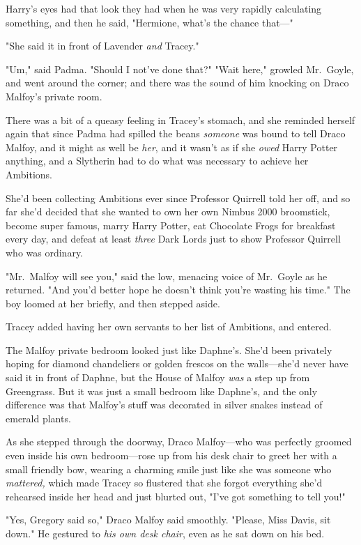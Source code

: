 Harry's eyes had that look they had when he was very rapidly calculating
something, and then he said, "Hermione, what's the chance that—"

"She said it in front of Lavender \emph{and} Tracey."

"Um," said Padma. "Should I not've done that?"
\sbreak
"Wait here," growled Mr.~Goyle, and went around the corner; and there was the
sound of him knocking on Draco Malfoy's private room.

There was a bit of a queasy feeling in Tracey's stomach, and she reminded
herself again that since Padma had spilled the beans \emph{someone} was bound
to tell Draco Malfoy, and it might as well be \emph{her}, and it wasn't as if
she \emph{owed} Harry Potter anything, and a Slytherin had to do what was
necessary to achieve her Ambitions.

She'd been collecting Ambitions ever since Professor Quirrell told her off, and
so far she'd decided that she wanted to own her own Nimbus 2000 broomstick,
become super famous, marry Harry Potter, eat Chocolate Frogs for breakfast
every day, and defeat at least \emph{three} Dark Lords just to show Professor
Quirrell who was ordinary.

"Mr.~Malfoy will see you," said the low, menacing voice of Mr.~Goyle as he
returned. "And you'd better hope he doesn't think you're wasting his time." The
boy loomed at her briefly, and then stepped aside.

Tracey added having her own servants to her list of Ambitions, and entered.

The Malfoy private bedroom looked just like Daphne's. She'd been privately
hoping for diamond chandeliers or golden frescos on the walls—she'd never
have said it in front of Daphne, but the House of Malfoy \emph{was} a step up
from Greengrass. But it was just a small bedroom like Daphne's, and the only
difference was that Malfoy's stuff was decorated in silver snakes instead of
emerald plants.

As she stepped through the doorway, Draco Malfoy—who was perfectly groomed
even inside his own bedroom—rose up from his desk chair to greet her with a
small friendly bow, wearing a charming smile just like she was someone who
\emph{mattered,} which made Tracey so flustered that she forgot everything
she'd rehearsed inside her head and just blurted out, "I've got something to
tell you!"

"Yes, Gregory said so," Draco Malfoy said smoothly. "Please, Miss Davis, sit
down." He gestured to \emph{his own desk chair}, even as he sat down on his bed.

